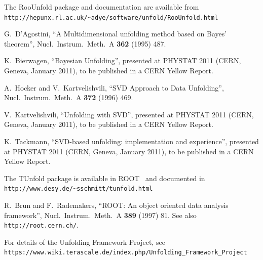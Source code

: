 \documentclass{cernrep}
\begin{document}
\begin{thebibliography}{99}

  The RooUnfold package and documentation are available from\\
  \verb=http://hepunx.rl.ac.uk/~adye/software/unfold/RooUnfold.html=

  G.~D'Agostini,
  ``A Multidimensional unfolding method based on Bayes' theorem'',
  Nucl.\ Instrum.\ Meth.\  A {\bf 362} (1995) 487.

  K.~Bierwagen,
  ``Bayesian Unfolding'',
  presented at PHYSTAT 2011 (CERN, Geneva, January 2011), to be published in a CERN Yellow Report.

  A.~Hocker and V.~Kartvelishvili,
  ``SVD Approach to Data Unfolding'',
  Nucl.\ Instrum.\ Meth.\  A {\bf 372} (1996) 469.

  V.~Kartvelishvili,
  ``Unfolding with SVD'',
  presented at PHYSTAT 2011 (CERN, Geneva, January 2011), to be published in a CERN Yellow Report.

  K.~Tackmann,
  ``SVD-based unfolding: implementation and experience'',
  presented at PHYSTAT 2011 (CERN, Geneva, January 2011), to be published in a CERN Yellow Report.

  The TUnfold package is available in ROOT~\cite{Brun:1997pa} and documented in\\
  \verb=http://www.desy.de/~sschmitt/tunfold.html=

  R.~Brun and F.~Rademakers,
  ``ROOT: An object oriented data analysis framework'',
  Nucl.\ Instrum.\ Meth.\  A {\bf 389} (1997) 81.
  See also \verb=http://root.cern.ch/=.

  For details of the Unfolding Framework Project, see\\
  \verb=https://www.wiki.terascale.de/index.php/Unfolding_Framework_Project=

\end{thebibliography}
\end{document}
